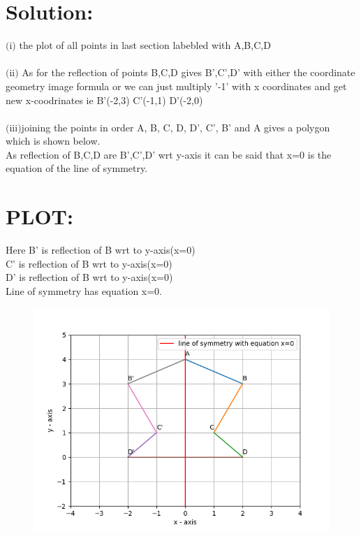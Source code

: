\documentclass[11pt, letterpaper]{article}
\begin{document}
\section{Solution:}
\begin{LARGE}
$($i$)$ the plot of all points in last section labebled with  A,B,C,D\\\\
$($ii$)$ As for the reflection of points B,C,D
 gives B',C',D' with either the coordinate geometry image formula or we can just  multiply '-1' with x coordinates and get new x-coodrinates ie B'(-2,3) C'(-1,1) D'(-2,0)\\\\
 
 $($iii$)$joining the points in order  A, B, C, D, D', C', B' and A gives a polygon which is shown below.\\
    As reflection of B,C,D are B',C',D' wrt y-axis it can be said that x=0 is the equation of the line of symmetry.
 \pagebreak
  \section{PLOT:}
  Here 
  B' is reflection of B wrt to y-axis(x=0)\\
  C' is reflection of B wrt to y-axis(x=0)\\
  D' is reflection of B wrt to y-axis(x=0)\\
  Line of symmetry has equation x=0.
 \begin{figure}[h]
 	\centering
 	\includegraphics[scale=1.0]{Figure_1.png}
 \end{figure}
 \end{LARGE}
\end{document}
